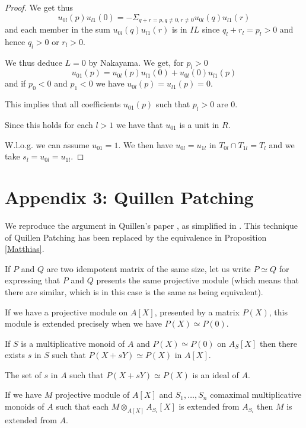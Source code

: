 \begin{proof}
  We get thus
  $$u_{0l}(p)u_{l1}(0) = - \Sigma_{q+r = p, q\neq 0, r\neq 0}u_{0l}(q)u_{l1}(r)$$
  and each member in the sum $u_{0l}(q)u_{l1}(r)$ is in $IL$ since $q_l+r_l = p_l>0$ and hence $q_l>0$ or $r_l>0$.

  We thus deduce $L=0$ by Nakayama. We get, for $p_l>0$
  $$u_{01}(p) = u_{0l}(p)u_{l1}(0) + u_{0l}(0)u_{l1}(p)$$
  and if $p_0<0$ and $p_1<0$ we have $u_{0l}(p) = u_{l1}(p) = 0$.

  This implies that all coefficients $u_{01}(p)$ such that $p_l>0$ are $0$.

  Since this holds for each $l>1$ we have that $u_{01}$ is a unit in $R$.

  W.l.o.g. we can assume $u_{01}= 1$. We then have $u_{0l} = u_{1l}$ in $T_{0l}\cap T_{1l} = T_l$
  and we take $s_l = u_{0l} = u_{1l}$.
\end{proof}

\newpage


\section*{Appendix 3: Quillen Patching}

We reproduce the argument in Quillen's paper \cite{Quillen}, as simplified in \cite{lombardi-quitte}.
This technique of Quillen Patching has been replaced by the equivalence in Proposition \ref{Matthias}.

If $P$ and $Q$ are two idempotent matrix of the same size, let us write $P\simeq Q$ for expressing that $P$ and $Q$ presents
the same projective module (which means that there are similar, which is in this case is the same as being equivalent).

If we have a projective module on $A[X]$, presented by a matrix $P(X)$, this module is extended
precisely when we have $P(X)\simeq P(0)$.

\begin{lemma}
  If $S$ is a multiplicative monoid of $A$ and $P(X)\simeq P(0)$ on $A_S[X]$ then there exists
  $s$ in $S$ such that $P(X+sY)\simeq P(X)$ in $A[X]$.
\end{lemma}

\begin{lemma}
  The set of $s$ in $A$ such that $P(X+sY)\simeq P(X)$ is an ideal of $A$.
\end{lemma}

\begin{corollary}
  If we have $M$ projective module of $A[X]$ and $S_1,\dots,S_n$ comaximal multiplicative monoids of $A$
  such that each $M\otimes_{A[X]} A_{S_i}[X]$ is extended from $A_{S_i}$ then $M$ is extended from $A$.
\end{corollary}

